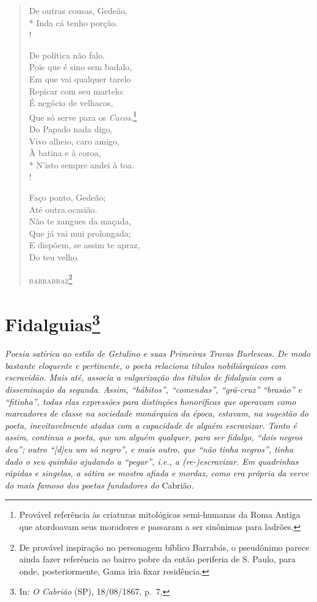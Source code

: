 \begin{verse}
De outras cousas, Gedeão,\\*
Inda cá tenho porção.\\!

De política não falo.\\
Pois que é sino sem badalo,\\
Em que vai qualquer tarelo\\
Repicar com seu martelo:\\
É negócio de velhacos,\\
Que só serve para os \emph{Cacos}.\footnote{ Provável referência às
                                criaturas mitológicas semi-humanas da Roma Antiga que atordoavam seus
                                moradores e passaram a ser sinônimas para ladrões.}\\
Do Papado nada digo,\\
Vivo alheio, caro amigo,\\
À batina e à coroa,\\*
N'isto sempre andei à toa.\\!

Faço ponto, Gedeão;\\
Até outra ocasião.\\
Não te zangues da maçada,\\
Que já vai mui prolongada;\\
E dispõem, se assim te apraz,\\
Do teu velho.\\\medskip

\hfill \textsc{barrabraz}\footnote{ De provável inspiração no personagem bíblico
  Barrabás, o pseudônimo parece ainda fazer referência ao bairro pobre
  da então periferia de S. Paulo, para onde, posteriormente, Gama iria
  fixar residência.}
\end{verse}

\chapter{Fidalguias\footnote{In: \emph{O
  Cabrião} (SP), 18/08/1867, p.~7.}}

\begin{didascalia}
\emph{Poesia satírica ao estilo de Getulino e suas Primeiras Trovas
Burlescas. De modo bastante eloquente e pertinente, o poeta relaciona
títulos nobiliárquicos com escravidão. Mais até, associa a vulgarização
dos títulos de fidalguia com a disseminação da segunda. Assim,
``hábitos'', ``comendas'', ``grã-cruz'' ``brasão'' e ``fitinha'', todas elas
expressões para distinções honoríficas que operavam como marcadores de
classe na sociedade monárquica da época, estavam, na sugestão do poeta,
inevitavelmente atadas com a capacidade de alguém escravizar. Tanto é
assim, continua o poeta, que um alguém qualquer, para ser fidalgo, ``dois
negros deu''; outro ``{[}d{]}eu um só negro'', e mais outro, que ``não tinha
negros'', tinha dado o seu quinhão ajudando a ``pegar'', i.e., a
(re-)escravizar. Em quadrinhas rápidas e singelas, a sátira se mostra
afiada e mordaz, como era própria da verve do mais famoso dos poetas
fundadores do} Cabrião\emph{.}
\end{didascalia}

